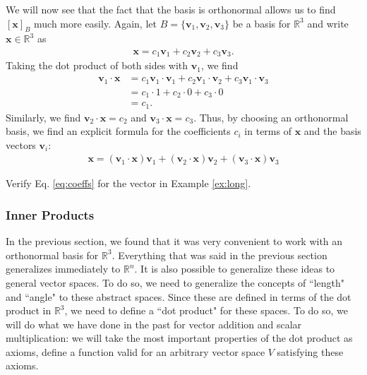 \documentclass[12pt,letterpaper,reqno]{article}
\numberwithin{equation}{section}
\newcommand{\bv}{\mathbf{v}}
\newcommand{\bx}{\mathbf{x}}
\begin{document}
We will now see that the fact that the basis is orthonormal allows us to find $[\bx]_B$ much more easily. Again, let $B=\{\bv_1,\bv_2,\bv_3\}$ be a basis for $\mathbb{R}^3$ and write $\bx \in \mathbb{R}^3$ as 
\begin{align*}
	\bx=c_1\bv_1+c_2\bv_2+c_3\bv_3.
\end{align*}
Taking the dot product of both sides with $\bv_1$, we find
\begin{align*}
	\bv_1 \cdot \bx & =c_1 \bv_1 \cdot \bv_1+c_2 \bv_1 \cdot \bv_2+c_3 \bv_1 \cdot \bv_3 \\
	&=c_1\cdot 1+c_2 \cdot 0+c_3\cdot 0 \\
	&=c_1.
\end{align*}
Similarly, we find $\bv_2 \cdot \bx = c_2$ and $\bv_3 \cdot \bx = c_3$. Thus, by choosing an orthonormal basis, we find an explicit formula for the coefficients $c_i$ in terms of $\bx$ and the basis vectors $\bv_i$:
\begin{align}\label{eq:coeffs}
	\bx=(\bv_1 \cdot \bx)\bv_1+(\bv_2 \cdot \bx)\bv_2+(\bv_3 \cdot \bx)\bv_3
\end{align}
\begin{exercise}
	Verify Eq. \eqref{eq:coeffs} for the vector in Example \ref{ex:long}.
\end{exercise}

\subsubsection{Inner Products}
In the previous section, we found that it was very convenient to work with an orthonormal basis for $\mathbb{R}^3$. Everything that was said in the previous section generalizes immediately to $\mathbb{R}^n$. It is also possible to generalize these ideas to general vector spaces. To do so, we need to generalize the concepts of ``length" and ``angle" to these abstract spaces. Since these are defined in terms of the dot product in $\mathbb{R}^3$, we need to define a ``dot product" for these spaces. To do so, we will do what we have done in the past for vector addition and scalar multiplication: we will take the most important properties of the dot product as axioms, define a function valid for an arbitrary vector space $V$ satisfying these axioms.
\end{document}
